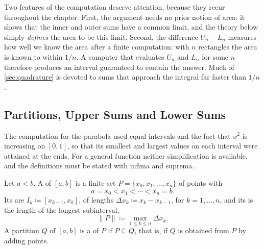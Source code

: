 \begin{table}
\end{table}

Two features of the computation deserve attention, because they recur throughout the chapter. First, the argument needs no prior notion of area: it shows that the inner and outer sums have a common limit, and the theory below simply \emph{defines} the area to be this limit. Second, the difference $U_n-L_n$ measures how well we know the area after a finite computation: with $n$ rectangles the area is known to within $1/n$. A computer that evaluates $U_n$ and $L_n$ for some $n$ therefore produces an interval guaranteed to contain the answer. Much of \cref{sec:quadrature} is devoted to sums that approach the integral far faster than $1/n$.

\subsection{Partitions, Upper Sums and Lower Sums}

The computation for the parabola used equal intervals and the fact that $x^2$ is increasing on $[0,1]$, so that its smallest and largest values on each interval were attained at the ends. For a general function neither simplification is available, and the definitions must be stated with infima and suprema.

\begin{definition}[Partition]
\label{def:interval-partition}
Let $a<b$. A  of $[a,b]$ is a finite set $P=\{x_0,x_1,\ldots,x_n\}$ of points with
\[
a=x_0<x_1<\cdots<x_n=b .
\]
Its  are $I_k\coloneqq[x_{k-1},x_k]$, of lengths $\Delta x_k\coloneqq x_k-x_{k-1}$, for $k=1,\ldots,n$, and its  is the length of the longest subinterval,
\[
\|P\|\coloneqq\max_{1\le k\le n}\Delta x_k .
\]
A partition $Q$ of $[a,b]$ is a  of $P$ if $P\subseteq Q$, that is, if $Q$ is obtained from $P$ by adding points.
\end{definition}

